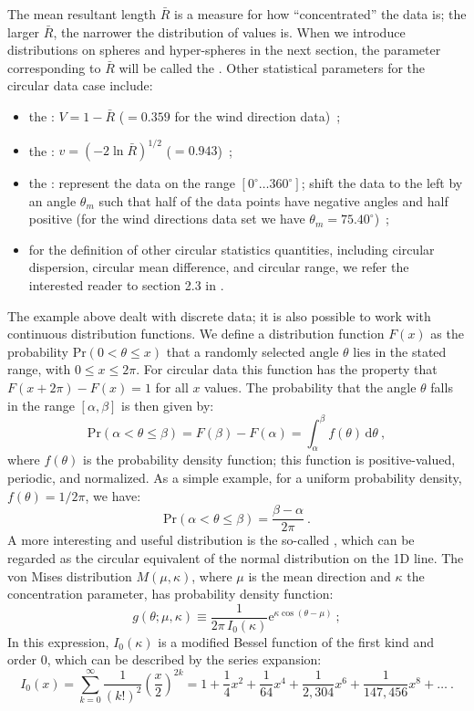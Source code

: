 The mean resultant length $\bar{R}$ is a measure for how ``concentrated'' the data is; the larger $\bar{R}$, the narrower the distribution of values is. When we introduce distributions on spheres and hyper-spheres in the next section, the parameter corresponding to $\bar{R}$ will be called the .  Other statistical parameters for the circular data case include:
\begin{itemize}
	\item the : $V=1-\bar{R}$ ($=0.359$ for the wind direction data)\ ;
	\item the : $v=(-2\ln\bar{R})^{1/2}$ ($=0.943$)\ ;
	\item the : represent the data on the range $[0^{\circ}\ldots 360^{\circ}]$; shift the data to the left by an angle $\theta_m$ such that half of the data points have negative angles and half positive (for the wind directions data set we have $\theta_m=75.40^{\circ}$)\ ;
	\item for the definition of other circular statistics quantities, including circular dispersion, circular mean difference, and circular range, we refer the interested reader to section 2.3 in \cite{mardia2009a}. 
\end{itemize}

The example above dealt with discrete data; it is also possible to work with continuous distribution functions. We define a distribution function $F(x)$ as the probability $\text{Pr}(0<\theta\le x)$ that a randomly selected angle $\theta$ lies in the stated range, with $0\le x\le 2\pi$.  For circular data this function has the property that $F(x+2\pi)-F(x)=1$ for all $x$ values.  The probability that the angle $\theta$ falls in the range $[\alpha,\beta]$ is then given by:
\[
	\text{Pr}(\alpha<\theta\le\beta)=F(\beta)-F(\alpha)=\int_{\alpha}^{\beta}f(\theta)\,\mathrm{d}\theta\ ,
\]
where $f(\theta)$ is the probability density function; this function is positive-valued, periodic, and normalized.  As a simple example, for a uniform probability density, $f(\theta) = 1/2\pi$, we have:
\[
	\text{Pr}(\alpha<\theta\le\beta)= \frac{\beta-\alpha}{2\pi}\ .
\]
A more interesting and useful distribution is the so-called , which can be regarded as the circular equivalent of the normal distribution on the 1D line.  The von Mises distribution $M(\mu,\kappa)$, where $\mu$ is the mean direction and $\kappa$ the concentration parameter, has probability density function:
\begin{equation}
	g(\theta;\mu,\kappa)\equiv \frac{1}{2\pi\,I_0(\kappa)}\mathrm{e}^{\kappa\cos(\theta-\mu)}\ ;
\end{equation}
In this expression, $I_0(\kappa)$ is a modified Bessel function of the first kind and order $0$, which can be described by the series expansion:
\[
	I_0(x) = \sum_{k=0}^{\infty}\frac{1}{(k!)^2}\left(\frac{x}{2}\right)^{2k}=1+\frac{1}{4}x^2+\frac{1}{64}x^4+\frac{1}{2,304}x^6 + \frac{1}{147,456}x^8 + \ldots\ .
\]

